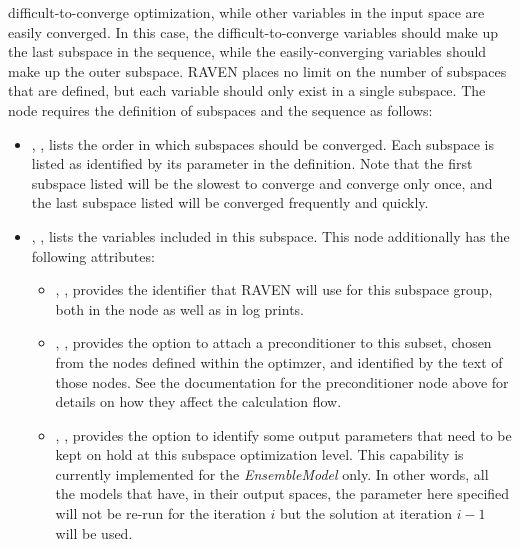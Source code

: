 \begin{itemize}
        difficult-to-converge optimization, while other variables in the input space are easily converged.  In
        this case, the difficult-to-converge variables should make up the last subspace in the sequence, while
        the easily-converging variables should make up the outer subspace.
        RAVEN places no limit on the
        number of subspaces that are defined, but each variable should only exist in a single subspace.
        The  node requires the definition of subspaces and the sequence as follows:
        \begin{itemize}
          \item {}, , lists the order in
            which subspaces should be converged.  Each subspace is listed as identified by its 
            parameter in the  definition.  Note that the first subspace listed will be the
            slowest to converge and converge only once, and the last subspace listed will be converged
            frequently and quickly.
          \item {}, , lists the variables
            included in this subspace.  This node additionally has the following attributes:
            \begin{itemize}
              \item {}, , provides the identifier that RAVEN
                will use for this subspace group, both in the  node as well as in log
                prints.
              \item {}, , provides the option to attach
                a preconditioner to this subset, chosen from the  nodes defined within
                the optimzer, and identified by the text of those nodes.  See the documentation for the
                preconditioner node above for details on how they affect the calculation flow.
              \item {}, , provides the option to identify some output parameters that
              need to be kept on hold at this subspace optimization level. This capability is
              currently implemented for the \textit{EnsembleModel} only.  In other words,
              all the models that have, in their output spaces, the parameter here specified
              will not be re-run for the iteration $i$ but the solution at iteration $i-1$ will be
              used.
            \end{itemize}
        \end{itemize}

\end{itemize}
